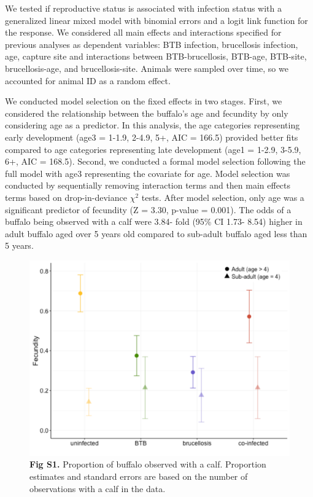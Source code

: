 \documentclass[10pt,letterpaper]{article}
\begin{document}
We tested if reproductive status is associated with infection status with a generalized linear mixed model with binomial errors and a logit link function for the response.  
We considered all main effects and interactions specified for previous analyses as dependent variables: BTB infection, brucellosis infection, age, capture site and interactions between BTB-brucellosis, BTB-age, BTB-site, brucellosis-age, and brucellosis-site. 
Animals were sampled over time, so we accounted for animal ID as a random effect.

We conducted model selection on the fixed effects in two stages.
First, we considered the relationship between the buffalo's age and fecundity by only considering age as a predictor. 
In this analysis, the age categories representing early development (age3 = 1-1.9, 2-4.9, 5+, AIC = 166.5) provided better fits compared to age categories representing late development (age1 = 1-2.9, 3-5.9, 6+, AIC = 168.5). 
Second, we conducted a formal model selection following the full model with age3 representing the covariate for age. 
Model selection was conducted by sequentially removing interaction terms and then main effects terms based on drop-in-deviance $\chi^2$ tests.
After model selection, only age was a significant predictor of fecundity (Z = 3.30, p-value = 0.001).  The odds of a buffalo being observed with a calf were 3.84- fold (95\% CI 1.73- 8.54) higher in adult buffalo aged over 5 years old compared to sub-adult buffalo aged less than 5 years.
 
 \pagebreak

\begin{figure}[ht]
\centering
\includegraphics[width=.99\linewidth]{Figure_S1.pdf}
\caption*{\textbf{Fig S1.} Proportion of buffalo observed with a calf.  Proportion estimates and standard errors are based on the number of observations with a calf in the data.}
\label{fig:figS1}
\end{figure}
\end{document}
